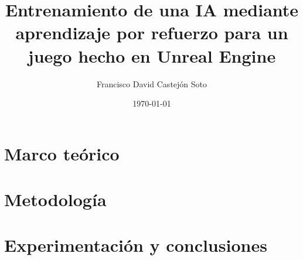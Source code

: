 \documentclass[11pt, a4paper]{book}
\author{Francisco David Castejón Soto}
\title{Entrenamiento de una IA mediante aprendizaje por refuerzo para un juego hecho en Unreal Engine}
\date{\today}
\begin{document}
\frontmatter





\cleardoublepage
\tableofcontents

\cleardoublepage
\listoffigures

\cleardoublepage
\listoftables

\mainmatter

\part{Marco teórico} \label{part:idea}






\part{Metodología} \label{part:preparacion}



\part{Experimentación y conclusiones} \label{part:resultados}




\backmatter

\cleardoublepage



% 
\end{document}
